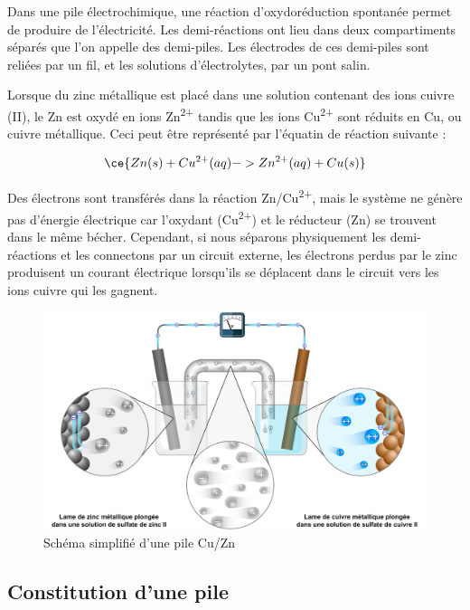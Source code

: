 \documentclass[
  11pt,
  a4paper,
  openany]{book}
\begin{document}
Dans une pile électrochimique, une réaction d'oxydoréduction spontanée permet de produire de l'électricité. Les demi-réactions ont lieu dans deux compartiments séparés que l'on appelle des demi-piles. Les électrodes de ces demi-piles sont reliées par un fil, et les solutions d'électrolytes, par un pont salin.

Lorsque du zinc métallique est placé dans une solution contenant des ions cuivre (II), le Zn est oxydé en ions Zn\textsuperscript{2+} tandis que les ions Cu\textsuperscript{2+} sont réduits en Cu, ou cuivre métallique. Ceci peut être représenté par l'équatin de réaction suivante :

\[
\ce{Zn(s) + Cu^{2+}(aq) -> Zn^{2+}(aq) + Cu(s)}
\]

Des électrons sont transférés dans la réaction Zn/Cu\textsuperscript{2+}, mais le système ne génère pas d'énergie électrique car l'oxydant (Cu\textsuperscript{2+}) et le réducteur (Zn) se trouvent dans le même bécher. Cependant, si nous séparons physiquement les demi-réactions et les connectons par un circuit externe, les électrons perdus par le zinc produisent un courant électrique lorsqu'ils se déplacent dans le circuit vers les ions cuivre qui les gagnent.

\begin{figure}

{\centering \includegraphics[width=0.9\linewidth]{images/pile-electrique-v2} 

}

\caption{Schéma simplifié d'une pile Cu/Zn}\label{fig:pile-electrique-v2}
\end{figure}

\hypertarget{constitution-dune-pile}{%
\subsection{Constitution d'une pile}\label{constitution-dune-pile}}
\end{document}

